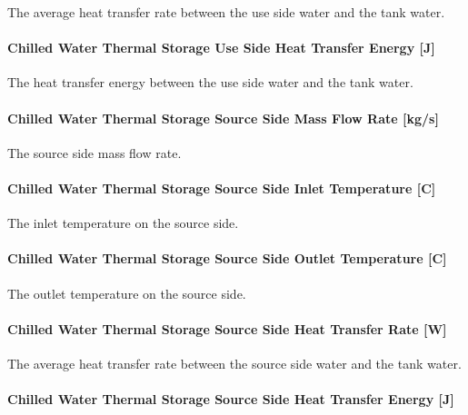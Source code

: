 The average heat transfer rate between the use side water and the tank water.

\paragraph{Chilled Water Thermal Storage Use Side Heat Transfer Energy {[}J{]}}\label{chilled-water-thermal-storage-use-side-heat-transfer-energy-j}

The heat transfer energy between the use side water and the tank water.

\paragraph{Chilled Water Thermal Storage Source Side Mass Flow Rate {[}kg/s{]}}\label{chilled-water-thermal-storage-source-side-mass-flow-rate-kgs}

The source side mass flow rate.

\paragraph{Chilled Water Thermal Storage Source Side Inlet Temperature {[}C{]}}\label{chilled-water-thermal-storage-source-side-inlet-temperature-c}

The inlet temperature on the source side.

\paragraph{Chilled Water Thermal Storage Source Side Outlet Temperature {[}C{]}}\label{chilled-water-thermal-storage-source-side-outlet-temperature-c}

The outlet temperature on the source side.

\paragraph{Chilled Water Thermal Storage Source Side Heat Transfer Rate {[}W{]}}\label{chilled-water-thermal-storage-source-side-heat-transfer-rate-w}

The average heat transfer rate between the source side water and the tank water.

\paragraph{Chilled Water Thermal Storage Source Side Heat Transfer Energy {[}J{]}}\label{chilled-water-thermal-storage-source-side-heat-transfer-energy-j}

